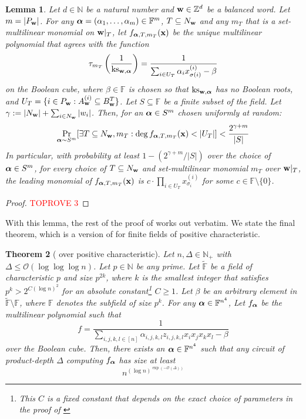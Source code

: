 \documentclass[11pt]{article}
\newtheorem{theorem}{Theorem}[section]
\newtheorem{lemma}[theorem]{Lemma}
\newcommand{\F}{\mathbb{F}}
\begin{document}
\begin{lemma}\label{lem: ght degree lower bound positive char}
Let $d\in \mathbb{N}$ be a natural number and $\mathbf{w} \in \mathbb{Z}^d$ be a balanced word. Let $m = |P_{\mathbf{w}}|$. For any $\bfalpha = (\alpha_1, \dots, \alpha_m) \in \F^m$, $T \subseteq N_{\mathbf{w}}$ and any $m_T$ that is a set-multilinear monomial on $\mathbf{w}|_T$, let $ f_{\boldsymbol{\alpha},T,m_T}(\mathbf{x})$ be the unique multilinear polynomial that agrees with the function $$\tau_{m_T} \left (\frac{1}{\operatorname{ks}_{\mathbf{w},\boldsymbol{\alpha}}} \right ) = \frac{1}{\sum_{i\in U_T}{\alpha_ix_{\sigma(i)}^{(i)}}-\beta}$$ on the Boolean cube, where $\beta \in \F$ is chosen so that $\operatorname{ks}_{\mathbf{w},\boldsymbol{\alpha}}$ has no Boolean roots, and $U_T = \{i \in P_{\mathbf{w}}: A_{\mathbf{w}}^{(i)} \subseteq B_{\mathbf{w}}^T\}$. 
Let $S \subseteq \F$ be a finite subset of the field. Let $\gamma := |N_{\mathbf{w}}|+\sum_{i\in N_{\mathbf{w}}}|w_i|$.
Then, for an $\boldsymbol{\alpha} \in S^m$ chosen uniformly at random: $$\Pr_{\boldsymbol{\alpha} \sim S^m}[\exists T\subseteq N_{\mathbf{w}}, m_T:\deg{f_{\ensuremath{\boldsymbol{\alpha}},T,m_T}(\mathbf{x})} < |U_T|] < \frac{2^{\gamma+m}}{|S|}$$
In particular, with probability at least $1-(2^{\gamma+m}/|S|)$ over the choice of $\boldsymbol{\alpha} \in S^m$, for every choice of $T\subseteq N_{\mathbf{w}}$ and set-multilinear monomial $m_T$ over $\mathbf{w}|_T$, the leading monomial of $f_{\boldsymbol{\alpha},T,m_T}(\mathbf{x})$ is $c\cdot\prod_{i\in U_T}x_{\sigma_i}^{(i)}$ for some $c\in\F\setminus\{0\}$.     
\end{lemma}
\begin{proof}\textcolor{red}{TOPROVE 3}\end{proof}

With this lemma, the rest of the proof of \cite{GHT} works out verbatim. We state the final theorem, which is a version of  for finite fields of positive characteristic.

\begin{theorem}[\cite{GHT} over positive characteristic]\label{thm: ght positive char}
Let $n, \Delta \in \mathbb{N}_{+}$ with $\Delta \leq \mathcal{O}(\log\log\log n)$. Let $p\in \mathbb{N}$ be any prime. Let $\tilde{\F}$ be a field of characteristic $p$ and size $p^{2k}$, where $k$ is the smallest integer that satisfies $p^k > 2^{C(\log n)^2}$ for an absolute constant\footnote{This $C$ is a fixed constant that depends on the exact choice of parameters in the proof of \cite{GHT}} $C\geq1$. Let $\beta$ be an arbitrary element in $\tilde{\F}\setminus\F$, where $\F$ denotes the subfield of size $p^k$. For any $\bfalpha \in \F^{n^4}$, Let $f_{\boldsymbol{\alpha}}$ be the multilinear polynomial such that $$ f = \frac{1}{\sum_{i,j,k,l\in[n]}\alpha_{i,j,k,l}z_{i,j,k,l}x_ix_jx_kx_l - \beta}$$
over the Boolean cube. Then, there exists an $\bfalpha \in \F^{n^4}$ such that any circuit of product-depth $\Delta$ computing $f_{\boldsymbol{\alpha}}$ has size at least $$n^{(\log n)^{\exp(-\mathcal{O}(\Delta))}}$$    
\end{theorem}
\end{document}
